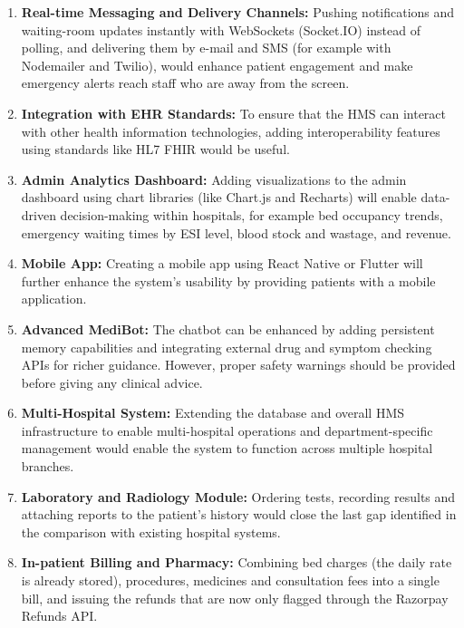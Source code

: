 \begin{enumerate}
    \item \textbf{Real-time Messaging and Delivery Channels:} Pushing notifications and waiting-room updates instantly with WebSockets (Socket.IO) instead of polling, and delivering them by e-mail and SMS (for example with Nodemailer and Twilio), would enhance patient engagement and make emergency alerts reach staff who are away from the screen.

    \item \textbf{Integration with EHR Standards:} To ensure that the HMS can interact with other health information technologies, adding interoperability features using standards like HL7 FHIR would be useful.

    \item \textbf{Admin Analytics Dashboard:} Adding visualizations to the admin dashboard using chart libraries (like Chart.js and Recharts) will enable data-driven decision-making within hospitals, for example bed occupancy trends, emergency waiting times by ESI level, blood stock and wastage, and revenue.

    \item \textbf{Mobile App:} Creating a mobile app using React Native or Flutter will further enhance the system's usability by providing patients with a mobile application.

    \item \textbf{Advanced MediBot:} The chatbot can be enhanced by adding persistent memory capabilities and integrating external drug and symptom checking APIs for richer guidance. However, proper safety warnings should be provided before giving any clinical advice.

    \item \textbf{Multi-Hospital System:} Extending the database and overall HMS infrastructure to enable multi-hospital operations and department-specific management would enable the system to function across multiple hospital branches.

    \item \textbf{Laboratory and Radiology Module:} Ordering tests, recording results and attaching reports to the patient's history would close the last gap identified in the comparison with existing hospital systems.

    \item \textbf{In-patient Billing and Pharmacy:} Combining bed charges (the daily rate is already stored), procedures, medicines and consultation fees into a single bill, and issuing the refunds that are now only flagged through the Razorpay Refunds API.


\end{enumerate}
